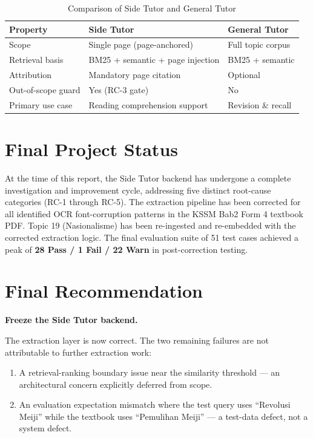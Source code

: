 \documentclass[12pt, a4paper]{report}
\begin{document}
\begin{table}[H]
  \centering
  \caption{Comparison of Side Tutor and General Tutor}
  \label{tab:tutor_comparison}
  \begin{tabularx}{\textwidth}{lXX}
    \toprule
    \textbf{Property} & \textbf{Side Tutor} & \textbf{General Tutor} \\
    \midrule
    Scope           & Single page (page-anchored)      & Full topic corpus \\
    Retrieval basis & BM25 + semantic + page injection & BM25 + semantic \\
    Attribution     & Mandatory page citation          & Optional \\
    Out-of-scope guard & Yes (RC-3 gate)             & No \\
    Primary use case & Reading comprehension support  & Revision \& recall \\
    \bottomrule
  \end{tabularx}
\end{table}

\section{Final Project Status}

At the time of this report, the Side Tutor backend has undergone a complete
investigation and improvement cycle, addressing five distinct root-cause
categories (RC-1 through RC-5). The extraction pipeline has been corrected for
all identified OCR font-corruption patterns in the KSSM Bab2 Form 4 textbook
PDF. Topic 19 (Nasionalisme) has been re-ingested and re-embedded with the
corrected extraction logic. The final evaluation suite of 51 test cases achieved
a peak of \textbf{28 Pass / 1 Fail / 22 Warn} in post-correction testing.

\section{Final Recommendation}

\textbf{Freeze the Side Tutor backend.}

The extraction layer is now correct. The two remaining failures are not
attributable to further extraction work:
\begin{enumerate}[noitemsep]
  \item A retrieval-ranking boundary issue near the similarity threshold —
        an architectural concern explicitly deferred from scope.
  \item An evaluation expectation mismatch where the test query uses
        ``Revolusi Meiji'' while the textbook uses ``Pemulihan Meiji'' —
        a test-data defect, not a system defect.
\end{enumerate}
\end{document}
